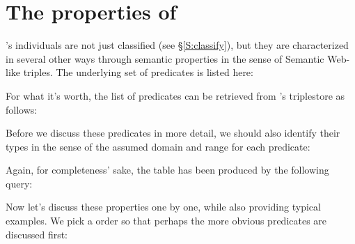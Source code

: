 
\section{The properties of \solasote}
\label{S:properties}

\solasote's individuals are not just classified (see
\S\ref{S:classify}), but they are characterized in several other ways
through semantic properties in the sense of Semantic Web-like
triples. The underlying set of predicates is listed here:


\noindent
For what it's worth, the list of predicates can be retrieved from
\solasote's triplestore as follows:


\noindent
Before we discuss these predicates in more detail, we should also
identify their types in the sense of the assumed domain and range for
each predicate:


\noindent
Again, for completeness' sake, the table has been produced by the
following query:


\noindent
Now let's discuss these properties one by one, while also providing
typical examples. We pick a order so that perhaps the more obvious
predicates are discussed first:

\medskip

